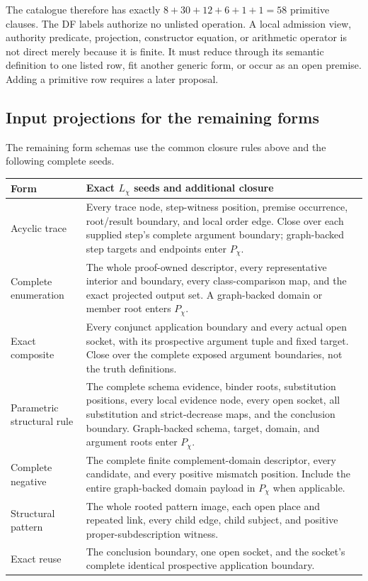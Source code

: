 \documentclass[11pt,twoside]{article}
\begin{document}
The catalogue therefore has exactly \(8+30+12+6+1+1=58\) primitive clauses.
The DF labels authorize no unlisted operation.  A local admission view, authority
predicate, projection, constructor equation, or arithmetic operator is not direct
merely because it is finite.  It must reduce through its semantic definition to
one listed row, fit another generic form, or occur as an open premise.  Adding a
primitive row requires a later proposal.

\subsection{Input projections for the remaining forms}

The remaining form schemas use the common closure rules above and the following
complete seeds.

\begin{longtable}{>{\raggedright\arraybackslash}p{}
                  >{\raggedright\arraybackslash}p{}}
\toprule
Form & Exact \(L_\chi\) seeds and additional closure\\
\midrule
\endhead%
Acyclic trace &
Every trace node, step-witness position, premise occurrence, root/result boundary,
and local order edge.  Close over each supplied step's complete argument boundary;
graph-backed step targets and endpoints enter \(P_\chi\).\\
Complete enumeration &
The whole proof-owned descriptor, every representative interior and boundary,
every class-comparison map, and the exact projected output set.  A graph-backed
domain or member root enters \(P_\chi\).\\
Exact composite &
Every conjunct application boundary and every actual open socket, with its
prospective argument tuple and fixed target.  Close over the complete exposed
argument boundaries, not the truth definitions.\\
Parametric structural rule &
The complete schema evidence, binder roots, substitution positions, every local
evidence node, every open socket, all substitution and strict-decrease maps, and
the conclusion boundary.  Graph-backed schema, target, domain, and argument roots
enter \(P_\chi\).\\
Complete negative &
The complete finite complement-domain descriptor, every candidate, and every
positive mismatch position.  Include the entire graph-backed domain payload in
\(P_\chi\) when applicable.\\
Structural pattern &
The whole rooted pattern image, each open place and repeated link, every child
edge, child subject, and positive proper-subdescription witness.\\
Exact reuse &
The conclusion boundary, one open socket, and the socket's complete identical
prospective application boundary.\\
\bottomrule
\end{longtable}
\end{document}
